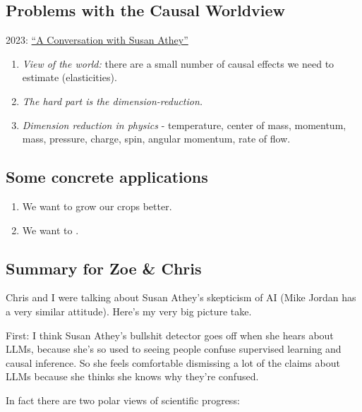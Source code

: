 \documentclass[
  10pt,
  letterpaper,
  DIV=11,
  numbers=noendperiod,
  oneside]{scrartcl}
\providecommand{\tightlist}{%
  \setlength{\itemsep}{0pt}\setlength{\parskip}{0pt}}\usepackage{longtable,booktabs,array}
\begin{document}
\subsection{Problems with the Causal
Worldview}\label{problems-with-the-causal-worldview}

2023:
\href{https://www.promarket.org/2023/07/08/a-conversation-with-susan-athey/}{``A
Conversation with Susan Athey''}

\begin{enumerate}
\def\labelenumi{\arabic{enumi}.}
\tightlist
\item
  \emph{View of the world:} there are a small number of causal effects
  we need to estimate (elasticities).
\item
  \emph{The hard part is the dimension-reduction.}
\item
  \emph{Dimension reduction in physics} - temperature, center of mass,
  momentum, mass, pressure, charge, spin, angular momentum, rate of
  flow.
\end{enumerate}

\subsection{Some concrete
applications}\label{some-concrete-applications}

\begin{enumerate}
\def\labelenumi{\arabic{enumi}.}
\tightlist
\item
  We want to grow our crops better.
\item
  We want to .
\end{enumerate}

\subsection{Summary for Zoe \& Chris}\label{summary-for-zoe-chris}

Chris and I were talking about Susan Athey's skepticism of AI (Mike
Jordan has a very similar attitude). Here's my very big picture take.

First: I think Susan Athey's bullshit detector goes off when she hears
about LLMs, because she's so used to seeing people confuse supervised
learning and causal inference. So she feels comfortable dismissing a lot
of the claims about LLMs because she thinks she knows why they're
confused.

In fact there are two polar views of scientific progress:
\end{document}
